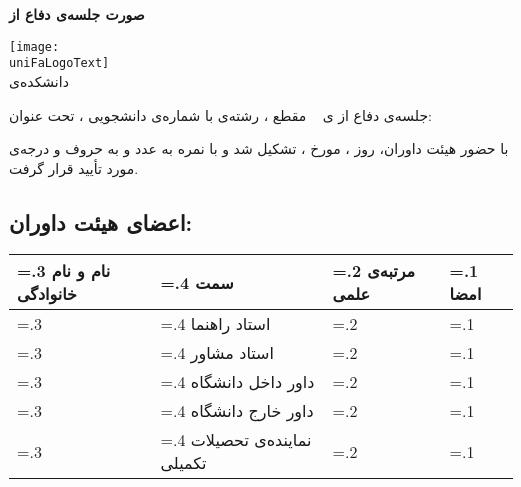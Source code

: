 \thispagestyle{empty}
\begingroup
  \noindent
    \begin{center}
{\LARGE\bfseries صورت جلسه‌ی دفاع از \whatDegreeTypeFull}
    \end{center}
\begin{center}
{\large
\texttt{[image: \\uniFaLogoText]}\\
دانشکده‌ی \qig\QfacultyName\qiga
}\\
\end{center}
\vspace*{\fill}
جلسه‌ی دفاع از 
\whatDegreeType‌ی
\yourgender\
\textbf{\QstudentName}
مقطع
\whatDegree،
رشته‌ی 
\qig\QstudentStudyField\qiga{\MySep}
\qig\QstudentStudyOrientation\qiga
با شماره‌ی دانشجویی
\textbf{\QstudentNumber}،
تحت عنوان:
\begin{center}
\textbf{\qig\QthesisTitle\qiga}
\end{center}
با حضور هیئت داوران، روز 
\fillin،
مورخ
\fillindate،
تشکیل شد و با نمره‌ به عدد
\fillin[1cm]
و به حروف 
\fillin[2.5cm]
و درجه‌ی 
\textbf{\whatDegree}
مورد تأیید قرار گرفت.
\subsection*{اعضای هیئت داوران:}
  \noindent\xdef\tempwidth{\the\linewidth}
  \begin{tabularx}{\linewidth}{
    |>{\hsize=.3\hsize}X|
    >{\hsize=.4\hsize}X|
    >{\hsize=.2\hsize}X|
    >{\hsize=.1\hsize}X|
  }
  \hline
  \rowcolor{myGray}
  نام و نام خانوادگی
  &
  سمت
  &
  مرتبه‌ی علمی 
  &
  امضا
  \\\hline
    
  &
  استاد راهنما
  &
 
  &
 
  \\\hline
      
  &
  استاد مشاور
  &
 
  &
 
  \\\hline
      
  &
  داور داخل دانشگاه
  &
 
  &
 
  \\\hline
      
  &
  داور خارج دانشگاه
  &
 
  &
 
  \\\hline
      
  &
  نماینده‌ی تحصیلات تکمیلی
  &
 
  &
 
  \\\hline
  \end{tabularx}
\vspace*{\fill}
\begin{flushleft}
\textbf{\QpostGradEduManagerName}\\
\QpostGradEduManagerTitle
\end{flushleft}
\vspace*{\fill}
\endgroup
\restoregeometry